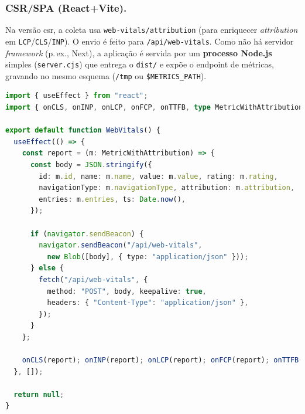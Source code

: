 \subsubsection{CSR/SPA (React+Vite).}
Na versão \acrshort{csr}, a coleta usa \texttt{web-vitals/attribution} (para enriquecer \textit{attribution} em \texttt{LCP}/\texttt{CLS}/\texttt{INP}). O envio é feito para \texttt{/api/web-vitals}. Como não há servidor \textit{framework} (p.\,ex., Next), a aplicação é servida por um \textbf{processo Node.js} simples (\texttt{server.cjs}) que entrega o \texttt{dist/} e expõe o endpoint de métricas, gravando no mesmo esquema (\texttt{/tmp} ou \texttt{\$METRICS\_PATH}).

\begin{lstlisting}[language=TypeScript,caption={Envio de métricas no cliente (CSR/React+Vite)}]
import { useEffect } from "react";
import { onCLS, onINP, onLCP, onFCP, onTTFB, type MetricWithAttribution } from "web-vitals/attribution";

export default function WebVitals() {
  useEffect(() => {
    const report = (m: MetricWithAttribution) => {
      const body = JSON.stringify({
        id: m.id, name: m.name, value: m.value, rating: m.rating,
        navigationType: m.navigationType, attribution: m.attribution,
        entries: m.entries, ts: Date.now(),
      });

      if (navigator.sendBeacon) {
        navigator.sendBeacon("/api/web-vitals",
          new Blob([body], { type: "application/json" }));
      } else {
        fetch("/api/web-vitals", {
          method: "POST", body, keepalive: true,
          headers: { "Content-Type": "application/json" },
        });
      }
    };

    onCLS(report); onINP(report); onLCP(report); onFCP(report); onTTFB(report);
  }, []);

  return null;
}
\end{lstlisting}

